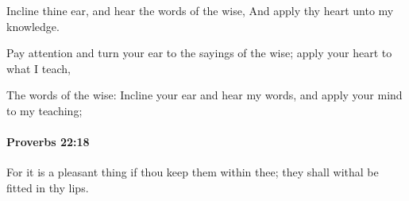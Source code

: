 			\begin{versebox}
					\item[BHS] 
					\item[ASV] Incline thine ear, and hear the words of the wise, And apply thy heart unto my knowledge.
					\item[NIV] Pay attention and turn your ear to the sayings of the wise; apply your heart to what I teach,
					\item[NRSV] The words of the wise: Incline your ear and hear my words, and apply your mind to my teaching;
			\end{versebox}

		\paragraph{Proverbs 22:18} %
			\label{PROVERBS-22-18}

			For it is a pleasant thing if thou keep them within thee; they shall withal be fitted in thy lips.

